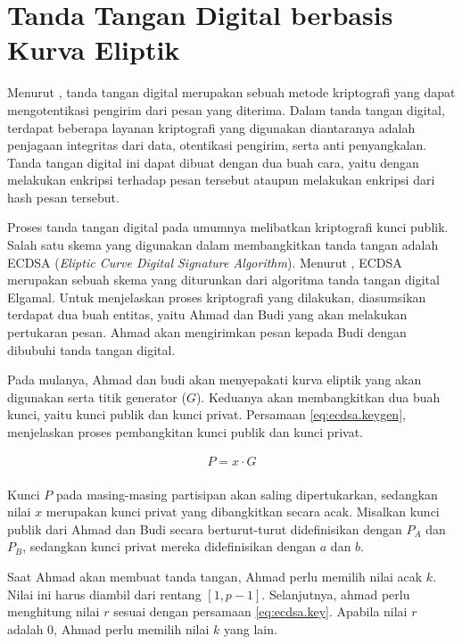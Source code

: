 \section{Tanda Tangan Digital berbasis Kurva Eliptik}
Menurut \textcite{munir2019}, tanda tangan digital merupakan sebuah metode kriptografi yang dapat mengotentikasi pengirim dari pesan yang diterima. Dalam tanda tangan digital, terdapat beberapa layanan kriptografi yang digunakan diantaranya adalah penjagaan integritas dari data, otentikasi pengirim, serta anti penyangkalan. Tanda tangan digital ini dapat dibuat dengan dua buah cara, yaitu dengan melakukan enkripsi terhadap pesan tersebut ataupun melakukan enkripsi dari hash pesan tersebut. 

Proses tanda tangan digital pada umumnya melibatkan kriptografi kunci publik. Salah satu skema yang digunakan dalam membangkitkan tanda tangan adalah ECDSA (\emph{Eliptic Curve Digital Signature Algorithm}). Menurut \textcite{munir2019}, ECDSA merupakan sebuah skema yang diturunkan dari algoritma tanda tangan digital Elgamal. Untuk menjelaskan proses kriptografi yang dilakukan, diasumsikan terdapat dua buah entitas, yaitu Ahmad dan Budi yang akan melakukan pertukaran pesan. Ahmad akan mengirimkan pesan kepada Budi dengan dibubuhi tanda tangan digital.

Pada mulanya, Ahmad dan budi akan menyepakati kurva eliptik yang akan digunakan serta titik generator ($G$). Keduanya akan membangkitkan dua buah kunci, yaitu kunci publik dan kunci privat. Persamaan \ref{eq:ecdsa.keygen}, menjelaskan proses pembangkitan kunci publik dan kunci privat.

\begin{equation}
  \label{eq:ecdsa.keygen}
  \begin{array}{l}   
    P = x \cdot G \\
  \end{array}
\end{equation}

Kunci $P$ pada masing-masing partisipan akan saling dipertukarkan, sedangkan nilai $x$ merupakan kunci privat yang dibangkitkan secara acak. Misalkan kunci publik dari Ahmad dan Budi secara berturut-turut didefinisikan dengan $P_{A}$ dan $P_{B}$, sedangkan kunci privat mereka didefinisikan dengan $a$ dan $b$.

Saat Ahmad akan membuat tanda tangan, Ahmad perlu memilih nilai acak $k$. Nilai ini harus diambil dari rentang $[1, p-1]$. Selanjutnya, ahmad perlu menghitung nilai $r$ sesuai dengan persamaan \ref{eq:ecdsa.key}. Apabila nilai $r$ adalah 0, Ahmad perlu memilih nilai $k$ yang lain.

